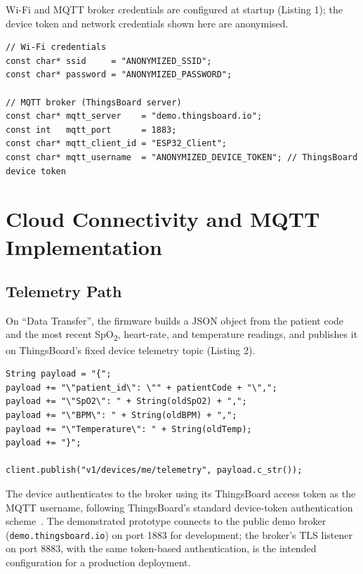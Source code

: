 \documentclass[pdflatex,sn-mathphys-num]{sn-jnl}
\begin{document}
\noindent\begin{minipage}{\linewidth}
Wi-Fi and MQTT broker credentials are configured at startup (Listing
1); the device token and network credentials shown here are
anonymised.

\begin{lstlisting}[caption={Wi-Fi and MQTT configuration (credentials anonymised).}]
// Wi-Fi credentials
const char* ssid     = "ANONYMIZED_SSID";
const char* password = "ANONYMIZED_PASSWORD";

// MQTT broker (ThingsBoard server)
const char* mqtt_server    = "demo.thingsboard.io";
const int   mqtt_port      = 1883;
const char* mqtt_client_id = "ESP32_Client";
const char* mqtt_username  = "ANONYMIZED_DEVICE_TOKEN"; // ThingsBoard device token
\end{lstlisting}
\end{minipage}\medskip

\section{Cloud Connectivity and MQTT Implementation}\label{sec:mqtt}

\subsection{Telemetry Path}

On ``Data Transfer'', the firmware builds a JSON object from the
patient code and the most recent SpO\textsubscript{2}, heart-rate, and
temperature readings, and publishes it on ThingsBoard's fixed device
telemetry topic (Listing 2).

\begin{lstlisting}[caption={JSON payload construction and MQTT publish (device firmware).}]
String payload = "{";
payload += "\"patient_id\": \"" + patientCode + "\",";
payload += "\"SpO2\": " + String(oldSpO2) + ",";
payload += "\"BPM\": " + String(oldBPM) + ",";
payload += "\"Temperature\": " + String(oldTemp);
payload += "}";

client.publish("v1/devices/me/telemetry", payload.c_str());
\end{lstlisting}

The device authenticates to the broker using its ThingsBoard access
token as the MQTT username, following ThingsBoard's standard
device-token authentication scheme~\cite{thingsboard}. The
demonstrated prototype connects to the public demo broker
(\texttt{demo.thingsboard.io}) on port 1883 for development; the
broker's TLS listener on port 8883, with the same token-based
authentication, is the intended configuration for a production
deployment.
\end{document}

